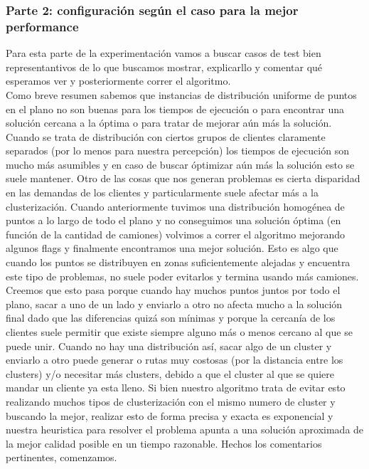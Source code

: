 \documentclass[11pt,a4paper]{article}
\begin{document}
\subsubsection{Parte 2: configuración según el caso para la mejor performance}
Para esta parte de la experimentación vamos a buscar casos de test bien representantivos de lo que buscamos mostrar, explicarllo y comentar qué esperamos ver y posteriormente correr el algoritmo.\\
Como breve resumen sabemos que instancias de distribución uniforme de puntos en el plano no son buenas para los tiempos de ejecución o para encontrar una solución cercana a la óptima o para tratar de mejorar aún más la solución. Cuando se trata de distribución con ciertos grupos de clientes claramente separados (por lo menos para nuestra percepción) los tiempos de ejecución son mucho más asumibles y en caso de buscar óptimizar aún más la solución esto se suele mantener. Otro de las cosas que nos generan problemas es cierta disparidad en las demandas de los clientes y particularmente suele afectar más a la clusterización. Cuando anteriormente tuvimos una distribución homogénea de puntos a lo largo de todo el plano y no conseguimos una solución óptima (en función de la cantidad de camiones) volvimos a correr el algoritmo mejorando algunos flags y finalmente encontramos una mejor solución. Esto es algo que cuando los puntos se distribuyen en zonas suficientemente alejadas y encuentra este tipo de problemas, no suele poder evitarlos y termina usando más camiones. Creemos que esto pasa porque cuando hay muchos puntos juntos por todo el plano, sacar a uno de un lado y enviarlo a otro no afecta mucho a la solución final dado que las diferencias quizá son mínimas y porque la cercanía de los clientes suele permitir que existe siempre alguno más o menos cercano al que se puede unir. Cuando no hay una distribución  así, sacar algo de un cluster y enviarlo a otro puede generar o rutas muy costosas (por la distancia entre los clusters) y/o necesitar más clusters, debido a que el cluster al que se quiere mandar un cliente ya esta lleno. Si bien nuestro algoritmo trata de evitar esto realizando muchos tipos de clusterización con el mismo numero de cluster y buscando la mejor, realizar esto de forma precisa y exacta es exponencial y nuestra heuristica para resolver el problema apunta a una solución aproximada de la mejor calidad posible en un tiempo razonable. Hechos los comentarios pertinentes, comenzamos.
\end{document}

